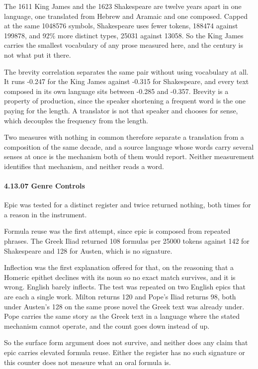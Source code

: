 The 1611 King James and the 1623 Shakespeare are twelve years apart in one language, one translated from Hebrew and Aramaic and one composed. Capped at the same 1048576 symbols, Shakespeare uses fewer tokens, 188474 against 199878, and 92\% more distinct types, 25031 against 13058. So the King James carries the smallest vocabulary of any prose measured here, and the century is not what put it there.

The brevity correlation separates the same pair without using vocabulary at all. It runs -0.247 for the King James against -0.315 for Shakespeare, and every text composed in its own language sits between -0.285 and -0.357. Brevity is a property of production, since the speaker shortening a frequent word is the one paying for the length. A translator is not that speaker and chooses for sense, which decouples the frequency from the length.

Two measures with nothing in common therefore separate a translation from a composition of the same decade, and a source language whose words carry several senses at once is the mechanism both of them would report. Neither measurement identifies that mechanism, and neither reads a word.

\paragraph{4.13.07 Genre Controls}

Epic was tested for a distinct register and twice returned nothing, both times for a reason in the instrument.

Formula reuse was the first attempt, since epic is composed from repeated phrases. The Greek Iliad returned 108 formulas per 25000 tokens against 142 for Shakespeare and 128 for Austen, which is no signature.

Inflection was the first explanation offered for that, on the reasoning that a Homeric epithet declines with its noun so no exact match survives, and it is wrong. English barely inflects. The test was repeated on two English epics that are each a single work. Milton returns 120 and Pope's Iliad returns 98, both under Austen's 128 on the same prose novel the Greek text was already under. Pope carries the same story as the Greek text in a language where the stated mechanism cannot operate, and the count goes down instead of up.

So the surface form argument does not survive, and neither does any claim that epic carries elevated formula reuse. Either the register has no such signature or this counter does not measure what an oral formula is.

